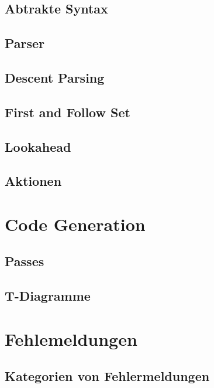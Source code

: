 \subsection{Abtrakte Syntax}
\subsection{Parser}
\subsection{Descent Parsing}
\subsection{First and Follow Set}
\subsection{Lookahead}
\subsection{Aktionen}
\section{Code Generation}
\subsection{Passes}
\subsection{T-Diagramme}
\section{Fehlemeldungen}
\subsection{Kategorien von Fehlermeldungen}
